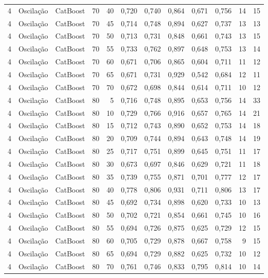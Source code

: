 \begin{longtable}{ccclrrrrrrrr}
4 & Oscilação & CatBoost & 70 & 40 & 0,720 & 0,740 & 0,864 & 0,671 & 0,756 & 14 & 15 \\
4 & Oscilação & CatBoost & 70 & 45 & 0,714 & 0,748 & 0,894 & 0,627 & 0,737 & 13 & 13 \\
4 & Oscilação & CatBoost & 70 & 50 & 0,713 & 0,731 & 0,848 & 0,661 & 0,743 & 13 & 15 \\
4 & Oscilação & CatBoost & 70 & 55 & 0,733 & 0,762 & 0,897 & 0,648 & 0,753 & 13 & 14 \\
4 & Oscilação & CatBoost & 70 & 60 & 0,671 & 0,706 & 0,865 & 0,604 & 0,711 & 11 & 12 \\
4 & Oscilação & CatBoost & 70 & 65 & 0,671 & 0,731 & 0,929 & 0,542 & 0,684 & 12 & 11 \\
4 & Oscilação & CatBoost & 70 & 70 & 0,672 & 0,698 & 0,844 & 0,614 & 0,711 & 10 & 12 \\
4 & Oscilação & CatBoost & 80 & 5 & 0,716 & 0,748 & 0,895 & 0,653 & 0,756 & 14 & 33 \\
4 & Oscilação & CatBoost & 80 & 10 & 0,729 & 0,766 & 0,916 & 0,657 & 0,765 & 14 & 21 \\
4 & Oscilação & CatBoost & 80 & 15 & 0,712 & 0,743 & 0,890 & 0,652 & 0,753 & 14 & 18 \\
4 & Oscilação & CatBoost & 80 & 20 & 0,709 & 0,744 & 0,894 & 0,643 & 0,748 & 14 & 19 \\
4 & Oscilação & CatBoost & 80 & 25 & 0,717 & 0,751 & 0,899 & 0,645 & 0,751 & 11 & 17 \\
4 & Oscilação & CatBoost & 80 & 30 & 0,673 & 0,697 & 0,846 & 0,629 & 0,721 & 11 & 18 \\
4 & Oscilação & CatBoost & 80 & 35 & 0,739 & 0,755 & 0,871 & 0,701 & 0,777 & 12 & 17 \\
4 & Oscilação & CatBoost & 80 & 40 & 0,778 & 0,806 & 0,931 & 0,711 & 0,806 & 13 & 17 \\
4 & Oscilação & CatBoost & 80 & 45 & 0,692 & 0,734 & 0,898 & 0,620 & 0,733 & 10 & 13 \\
4 & Oscilação & CatBoost & 80 & 50 & 0,702 & 0,721 & 0,854 & 0,661 & 0,745 & 10 & 16 \\
4 & Oscilação & CatBoost & 80 & 55 & 0,694 & 0,726 & 0,875 & 0,625 & 0,729 & 12 & 15 \\
4 & Oscilação & CatBoost & 80 & 60 & 0,705 & 0,729 & 0,878 & 0,667 & 0,758 & 9 & 15 \\
4 & Oscilação & CatBoost & 80 & 65 & 0,694 & 0,729 & 0,882 & 0,625 & 0,732 & 10 & 12 \\
4 & Oscilação & CatBoost & 80 & 70 & 0,761 & 0,746 & 0,833 & 0,795 & 0,814 & 10 & 14 \\

\end{longtable}
